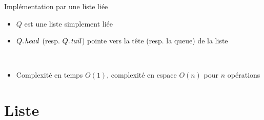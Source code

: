 \begin{frame}{Implémentation par une liste liée}
\begin{itemize}
\item $Q$ est une liste simplement liée
\item $\attrib{Q}{head}$ (resp. $\attrib{Q}{tail}$) pointe vers la tête (resp. la queue) de la liste

\begin{center}
\begin{small}
~~~~~
\end{small}
\end{center}

\item Complexité en temps $O(1)$, complexité en espace $O(n)$ pour $n$ opérations
\end{itemize}

\end{frame}

\section{Liste}

